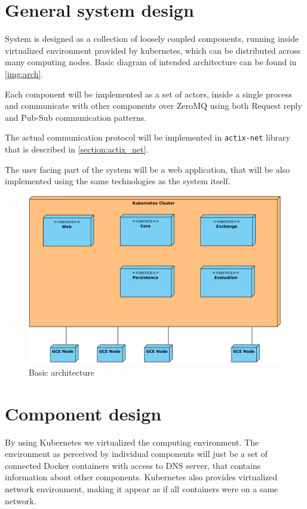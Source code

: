 \section{General system design}
System is designed as a collection of loosely coupled components, running inside virtualized environment provided by kubernetes, which
can be distributed across many computing nodes. Basic diagram of intended architecture can be found in \autoref{img:arch}.

Each component will be implemented as a set of actors, inside a single process and communicate with other components
over ZeroMQ using both Request reply and Pub-Sub communication patterns.

The actual communication protocol will be implemented in \verb|actix-net| library that is described in \autoref{section:actix_net}.

The user facing part of the system will be a web application, that will be also implemented using the same technologies
as the system itself.


\begin{figure}[H]
    \includegraphics[width=\textwidth]{obrazky-figures/Deployment Diagram1.png}
    \caption{Basic architecture}
    \label{img:arch}
\end{figure}


\section{Component design}
By using Kubernetes we virtualized the computing environment. The environment as perceived by individual components
will just be a set of connected Docker containers with access to DNS server, that contains information about other components.
Kubernetes also provides virtualized network environment, making it appear as if all containers were on a same network.

